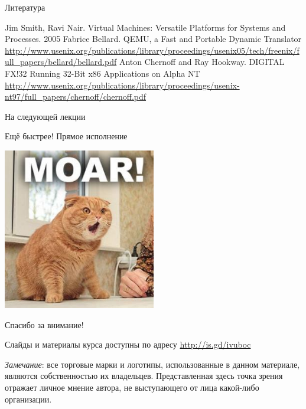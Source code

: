 \documentclass{beamer}
\begin{document}
\begin{frame}[allowframebreaks]{Литература}
\begin{thebibliography}{99}
     Jim Smith, Ravi Nair. Virtual Machines: Versatile Platforms for Systems and Processes. 2005
     Fabrice Bellard. QEMU, a Fast and Portable Dynamic Translator \url{http://www.usenix.org/publications/library/proceedings/usenix05/tech/freenix/full_papers/bellard/bellard.pdf}
     Anton Chernoff and Ray Hookway. {DIGITAL FX!32} Running 32-Bit x86 Applications on {Alpha} {NT} \url{http://www.usenix.org/publications/library/proceedings/usenix-nt97/full_papers/chernoff/chernoff.pdf}
\end{thebibliography}
\end{frame}


\begin{frame}{На следующей лекции}
\centering

Ещё быстрее! Прямое исполнение
\vfill

\includegraphics[width=0.5\textwidth]{./moar}
\end{frame}

\begin{frame}

{\huge{Спасибо за внимание!}\par}

\vfill

Слайды и материалы курса доступны по адресу \url{http://is.gd/ivuboc} %

\vfill

\tiny{\textit{Замечание}: все торговые марки и логотипы, использованные в данном материале, являются собственностью их владельцев. Представленная здесь точка зрения отражает личное мнение автора, не выступающего от лица какой-либо организации.}

\end{frame}
\end{document}
